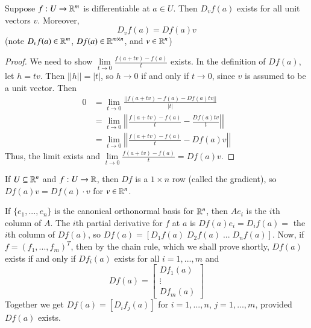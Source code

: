 \begin{prop}
    Suppose $f:U\rightarrow \mathbb R^m$ is differentiable at $a \in U$. Then $D_vf(a)$ exists for all unit vectors $v$. Moreover, $$D_vf(a) = Df(a)v$$ (note $D_vf(a) \in \mathbb R^m$, $Df(a) \in \mathbb R^{m\times n}$, and $v \in \mathbb R^n$)
\end{prop}
\begin{proof}
    We need to show $\lim\limits_{t\rightarrow 0}\frac{f(a+tv)-f(a)}{t}$ exists. In the definition of $Df(a)$, let $h = tv$. Then $||h|| = |t|$, so $h\rightarrow 0$ if and only if $t\rightarrow 0$, since $v$ is assumed to be a unit vector. Then \begin{align*}
        0 &= \lim\limits_{t\rightarrow 0}\frac{||f(a+tv) - f(a) - Df(a)tv||}{|t|} \\
        &= \lim\limits_{t\rightarrow 0}\left|\left|\frac{f(a+tv) - f(a)}{t} - \frac{Df(a)tv}{t}\right|\right| \\
        &= \lim\limits_{t\rightarrow 0}\left|\left|\frac{f(a+tv)-f(a)}{t} - Df(a)v\right|\right|
    \end{align*}
    Thus, the limit exists and $\lim\limits_{t\rightarrow 0}\frac{f(a+tv)-f(a)}{t} = Df(a)v$.
\end{proof}

\begin{eg}
    If $U \subseteq \mathbb R^n$ and $f:U\rightarrow \mathbb R$, then $Df$ is a $1\times n$ row (called the gradient), so $Df(a)v = Df(a)\cdot v$ for $v \in \mathbb R^n$.
\end{eg}

If $\{e_1,...,e_n\}$ is the canonical orthonormal basis for $\mathbb R^n$, then $Ae_i$ is the $i$th column of $A$. The $i$th partial derivative for $f$ at $a$ is $Df(a)e_i = D_if(a) = $ the $i$th column of $Df(a)$, so $Df(a) = [D_1f(a)\;D_2f(a)\;...\;D_nf(a)]$. Now, if $f = (f_1,...,f_m)^T$, then by the chain rule, which we shall prove shortly, $Df(a)$ exists if and only if $Df_i(a)$ exists for all $i = 1,...,m$ and $$Df(a) = \begin{bmatrix} Df_1(a) \\ \vdots \\ Df_m(a)\end{bmatrix}$$ Together we get $Df(a) = [D_if_j(a)]$ for $i = 1,...,n$, $j = 1,...,m$, provided $Df(a)$ exists.


